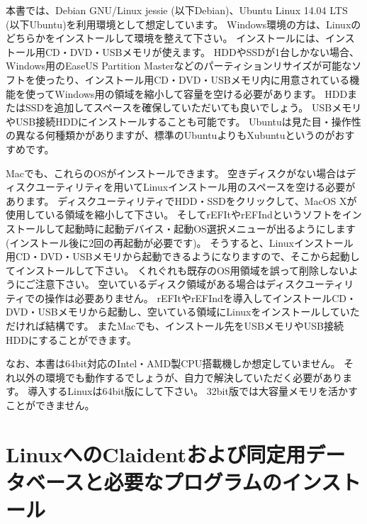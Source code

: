 \documentclass[titlepage,10pt,a4paper]{jsbook}
\begin{document}
本書では、Debian GNU/Linux jessie (以下Debian)、Ubuntu Linux 14.04 LTS (以下Ubuntu)を利用環境として想定しています。
Windows環境の方は、Linuxのどちらかをインストールして環境を整えて下さい。
インストールには、インストール用CD・DVD・USBメモリが使えます。
HDDやSSDが1台しかない場合、Windows用のEaseUS Partition Masterなどのパーティションリサイズが可能なソフトを使ったり、インストール用CD・DVD・USBメモリ内に用意されている機能を使ってWindows用の領域を縮小して容量を空ける必要があります。
HDDまたはSSDを追加してスペースを確保していただいても良いでしょう。
USBメモリやUSB接続HDDにインストールすることも可能です。
Ubuntuは見た目・操作性の異なる何種類かがありますが、標準のUbuntuよりもXubuntuというのがおすすめです。

Macでも、これらのOSがインストールできます。
空きディスクがない場合はディスクユーティリティを用いてLinuxインストール用のスペースを空ける必要があります。
ディスクユーティリティでHDD・SSDをクリックして、MacOS Xが使用している領域を縮小して下さい。
そしてrEFItやrEFIndというソフトをインストールして起動時に起動デバイス・起動OS選択メニューが出るようにします(インストール後に2回の再起動が必要です)。
そうすると、Linuxインストール用CD・DVD・USBメモリから起動できるようになりますので、そこから起動してインストールして下さい。
くれぐれも既存のOS用領域を誤って削除しないようにご注意下さい。
空いているディスク領域がある場合はディスクユーティリティでの操作は必要ありません。
rEFItやrEFIndを導入してインストールCD・DVD・USBメモリから起動し、空いている領域にLinuxをインストールしていただければ結構です。
またMacでも、インストール先をUSBメモリやUSB接続HDDにすることができます。

なお、本書は64bit対応のIntel・AMD製CPU搭載機しか想定していません。
それ以外の環境でも動作するでしょうが、自力で解決していただく必要があります。
導入するLinuxは64bit版にして下さい。
32bit版では大容量メモリを活かすことができません。

\section{LinuxへのClaidentおよび同定用データベースと必要なプログラムのインストール}
\end{document}
